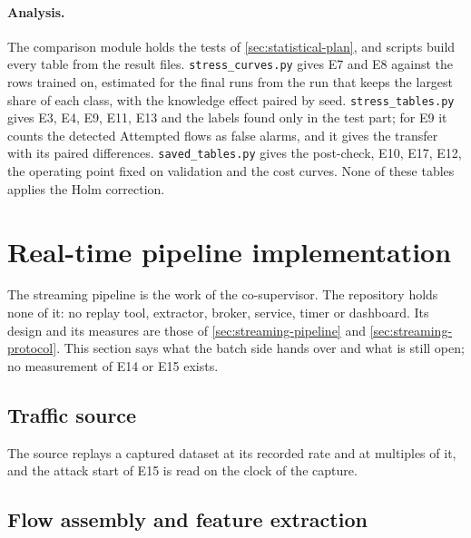 \paragraph{Analysis.}
The comparison module holds the tests of \cref{sec:statistical-plan}, and scripts build every
table from the result files. \texttt{stress\_curves.py} gives E7 and E8 against the rows trained
on, estimated for the final runs from the run that keeps the largest share of each class, with the
knowledge effect paired by seed. \texttt{stress\_tables.py} gives E3, E4, E9, E11, E13 and the
labels found only in the test part; for E9 it counts the detected Attempted flows as false alarms,
and it gives the transfer with its paired differences. \texttt{saved\_tables.py} gives the
post-check, E10, E17, E12, the operating point fixed on validation and the cost curves. None of these
tables applies the Holm correction.

\section{Real-time pipeline implementation}
\label{sec:realtime-pipeline}

The streaming pipeline is the work of the co-supervisor. The repository holds none of it: no
replay tool, extractor, broker, service, timer or dashboard. Its design and its measures are
those of \cref{sec:streaming-pipeline} and \cref{sec:streaming-protocol}. This section says what
the batch side hands over and what is still open; no measurement of E14 or E15 exists.

\subsection{Traffic source}
\label{sec:impl-source}

The source replays a captured dataset at its recorded rate and at multiples of it, and the
attack start of E15 is read on the clock of the capture.

\subsection{Flow assembly and feature extraction}
\label{sec:impl-flows}

